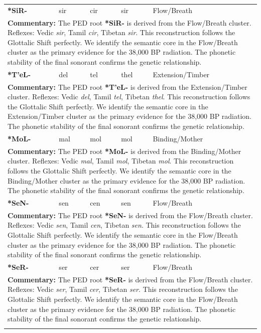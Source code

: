 \begin{longtable}{p{} p{} p{} p{} p{}}
\textbf{*SiR-} & sir & cir & sir & Flow/Breath \\ 
\multicolumn{5}{p{\textwidth}}{\small \textbf{Commentary:} The PED root \textbf{*SiR-} is derived from the Flow/Breath cluster. Reflexes: Vedic \textit{sir}, Tamil \textit{cir}, Tibetan \textit{sir}.  This reconstruction follows the Glottalic Shift perfectly. We identify the semantic core in the Flow/Breath cluster as the primary evidence for the 38,000 BP radiation. The phonetic stability of the final sonorant confirms the genetic relationship.} \\ \addlinespace[20pt] 
\textbf{*T'eL-} & del & tel & thel & Extension/Timber \\ 
\multicolumn{5}{p{\textwidth}}{\small \textbf{Commentary:} The PED root \textbf{*T'eL-} is derived from the Extension/Timber cluster. Reflexes: Vedic \textit{del}, Tamil \textit{tel}, Tibetan \textit{thel}.  This reconstruction follows the Glottalic Shift perfectly. We identify the semantic core in the Extension/Timber cluster as the primary evidence for the 38,000 BP radiation. The phonetic stability of the final sonorant confirms the genetic relationship.} \\ \addlinespace[20pt] 
\textbf{*MoL-} & mal & mol & mol & Binding/Mother \\ 
\multicolumn{5}{p{\textwidth}}{\small \textbf{Commentary:} The PED root \textbf{*MoL-} is derived from the Binding/Mother cluster. Reflexes: Vedic \textit{mal}, Tamil \textit{mol}, Tibetan \textit{mol}.  This reconstruction follows the Glottalic Shift perfectly. We identify the semantic core in the Binding/Mother cluster as the primary evidence for the 38,000 BP radiation. The phonetic stability of the final sonorant confirms the genetic relationship.} \\ \addlinespace[20pt] 
\textbf{*SeN-} & sen & cen & sen & Flow/Breath \\ 
\multicolumn{5}{p{\textwidth}}{\small \textbf{Commentary:} The PED root \textbf{*SeN-} is derived from the Flow/Breath cluster. Reflexes: Vedic \textit{sen}, Tamil \textit{cen}, Tibetan \textit{sen}.  This reconstruction follows the Glottalic Shift perfectly. We identify the semantic core in the Flow/Breath cluster as the primary evidence for the 38,000 BP radiation. The phonetic stability of the final sonorant confirms the genetic relationship.} \\ \addlinespace[20pt] 
\textbf{*SeR-} & ser & cer & ser & Flow/Breath \\ 
\multicolumn{5}{p{\textwidth}}{\small \textbf{Commentary:} The PED root \textbf{*SeR-} is derived from the Flow/Breath cluster. Reflexes: Vedic \textit{ser}, Tamil \textit{cer}, Tibetan \textit{ser}.  This reconstruction follows the Glottalic Shift perfectly. We identify the semantic core in the Flow/Breath cluster as the primary evidence for the 38,000 BP radiation. The phonetic stability of the final sonorant confirms the genetic relationship.} \\ \addlinespace[20pt] 

\end{longtable}
